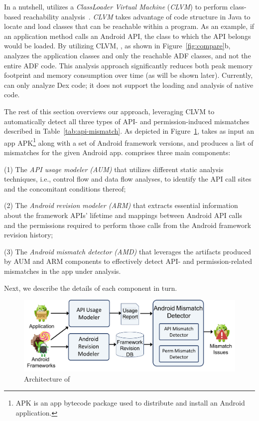 {In a nutshell, \@approach utilizes a \emph{ClassLoader
Virtual Machine} (\emph{CLVM}) to perform class-based
reachability analysis~\cite{tsutano2017efficient}.
\emph{CLVM} takes advantage of code structure in Java
to locate and load classes that can be reachable within
a program.  As an example, if an application method
calls an Android API, the class to which the API
belongs would be loaded.  By utilizing CLVM, \@approach
, as shown in Figure~\ref{fig:compare}b, analyzes the application classes and only the reachable
ADF classes, and not the entire ADF code. This analysis
approach significantly reduces both peak memory
footprint and memory consumption over time (as will be
shown later).  Currently, \@approach can only analyze
Dex code; it does not support the loading and analysis
of native code.  

The rest of this section overviews our approach,
leveraging CLVM to automatically detect all three types
of API- and permission-induced mismatches described in
Table~\ref{tab:api-mismatch}. As depicted in
Figure~\ref{fig:arch}, \@approach takes as input an app
APK\footnote{APK is an app bytecode package used to
distribute and install an Android application.} along
with a set of Android framework versions, and produces
a list of mismatches for the given Android app.  
\@approach comprises three main components:
}

(1) The \textit{API usage modeler (AUM)} that utilizes
different static analysis techniques, i.e., control
flow and data flow analyses, to  identify the API call
sites and the concomitant conditions thereof; 

(2) The \textit{Android revision modeler (ARM)} that
extracts essential information about the framework
APIs' lifetime and mappings between Android API calls
and the permissions required to perform those calls
from the Android framework revision history;

(3) The \textit{Android mismatch detector (AMD)} that
leverages the artifacts produced by AUM and ARM
components to effectively detect API- and
permission-related mismatches in the app under
analysis.

Next, we describe the details of each component in
turn.
 

\begin{figure}[t!]
    \centering
    \includegraphics[width=\linewidth]{images/Approach.png}
    \vspace{-0.2cm}    
    \caption{Architecture of \@approach}
    \label{fig:arch}
    \vspace{-0.3cm}
\end{figure}


